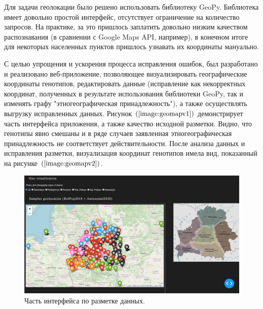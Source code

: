 Для задачи геолокации было решено использовать библиотеку GeoPy. Библиотека имеет
довольно простой интерфейс, отсутствует ограничение на количество запросов. На практике,
за это пришлось заплатить довольно низким качеством распознавания (в сравнении с
Google Maps API, например), в конечном итоге для некоторых населенных пунктов пришлось узнавать
их координаты мануально.

С целью упрощения и ускорения процесса исправления ошибок, был разработано и реализовано
веб-приложение, позволяющее визуализировать географические координаты генотипов,
редактировать данные (исправление как некорректных координат, полученных в результате
использования библиотеки GeoPy, так и изменять графу "этногеографическая принадлежность"),
а также осуществлять выгрузку исправленных данных. Рисунок $\left(\ref{image:geomapv1}\right)$
демонстрирует часть интерфейса приложения, а также качество исходной разметки. Видно,
что генотипы явно смешаны и в ряде случаев заявленная этногеографическая принадлежность
не соответствует действительности. После анализа данных и исправления разметки,
визуализация координат генотипов имела вид, показанный на рисунке $\left(\ref{image:geomapv2}\right)$.

\begin{figure}[h]
\begin{center}
\includegraphics[width=14cm]{images/geomap_v1.png}
\end{center}
  \caption{Часть интерфейса по разметке данных.}
  \label{image:geomapv1}
\end{figure}

